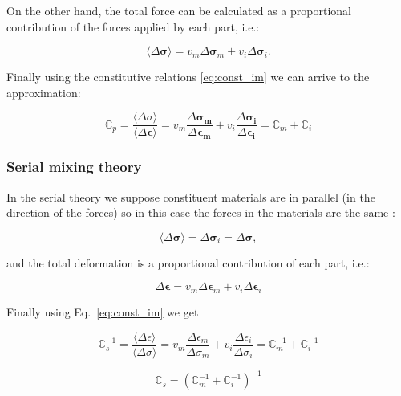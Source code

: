 \documentclass[review]{elsarticle}
\begin{document}
\noindent
On the other hand, the total force can be calculated as a proportional
contribution of the forces applied by each part, i.e.:

\begin{equation}
\langle\Delta \bm{\sigma}\rangle  = v_m \Delta \bm{\sigma}_m + v_i \Delta \bm{\sigma}_i.
\end{equation}

Finally using the constitutive relations \ref{eq:const_im} we can arrive to the
approximation:

\begin{equation}
\mathbb{C}_p = \frac{\langle\Delta \sigma\rangle}{\langle\Delta \bm{\epsilon}\rangle} = 
v_m\frac{\Delta \bm{\sigma_m}}{\Delta \bm{\epsilon_m}} +
v_i\frac{\Delta \bm{\sigma_i}}{\Delta \bm{\epsilon_i}} = 
\mathbb{C}_m + \mathbb{C}_i
\label{eq:parallel_mix}
\end{equation}


\subsubsection{Serial mixing theory}
In the serial theory we suppose constituent materials are in 
parallel (in the direction of the forces) so in
this case the forces in the materials are the same :

\begin{equation}
\langle \Delta \bm{\sigma} \rangle= \Delta \bm{\sigma}_i = \Delta \bm{\sigma},
\end{equation}

\noindent
and the total deformation is a proportional contribution of each part, i.e.:

\begin{equation}
\Delta \bm{\epsilon} = v_m \Delta \bm{\epsilon}_m + v_i \Delta \bm{\epsilon}_i
\end{equation}

Finally using Eq.~\ref{eq:const_im} we get

\begin{equation*}
\mathbb{C}_s^{-1} = \frac{\langle\Delta \epsilon\rangle}{\langle\Delta \sigma\rangle} = 
v_m\frac{\Delta \epsilon_m}{\Delta \sigma_m} +
v_i\frac{\Delta \epsilon_i}{\Delta \sigma_i} = 
\mathbb{C}_m^{-1} + \mathbb{C}_i^{-1}
\end{equation*}

\begin{equation}
\mathbb{C}_s =
\left( \mathbb{C}_m^{-1} + \mathbb{C}_i^{-1} \right)^{-1}
\label{eq:serial_mix}
\end{equation}
\end{document}
